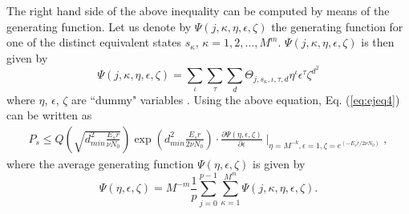 \documentclass[12pt,twoside,onecolumn,a4paper,english]{IEEEtran2e}
\begin{document}
The right hand side of the above inequality can be computed by
means of the generating function. Let us denote by $\Psi(j,\kappa,\eta,\epsilon,\zeta)$
the generating function for one of the distinct equivalent states
$s_\kappa$, $\kappa=1,2,\ldots,M^m$. $\Psi(j,\kappa,\eta,\epsilon,\zeta)$ is then
given by %
\begin{equation}%
\Psi(j,\kappa,\eta,\epsilon,\zeta)=\sum_\iota\sum_\tau\sum_d{\Theta_{j,s_\kappa,\iota,\tau,d}}\eta^\iota\epsilon^\tau\zeta^{d^2}
\end{equation}
where $\eta$, $\epsilon$, $\zeta$ are ``dummy" variables \cite{SER-bound}.
Using the above equation, Eq. (\ref{eq:ejeq4}) can be written as
\begin{eqnarray}\label{eq:ejeq5}%
P_s
{\leq}%
Q\left(\sqrt{d_{min}^2\frac{E_sr}{\nu N_0}}\right)\exp\left(d_{min}^2\frac{E_sr}{2\nu N_0}\right){\cdot}%
\frac{{\partial}\Psi(\eta,\epsilon,\zeta)}{{\partial}\epsilon}\mid_{\eta=M^{-k},\epsilon=1,\zeta=e^{(-E_sr/{2\nu
N_0})}},
\end{eqnarray}
where the average generating function $\Psi(\eta,\epsilon,\zeta)$ is given
by %
\begin{equation}%
\Psi(\eta,\epsilon,\zeta)=M^{-m}\frac{1}{p}\sum_{j=0}^{p-1}\sum_{\kappa=1}^{M^m}\Psi(j,\kappa,\eta,\epsilon,\zeta).
\end{equation}
\end{document}
